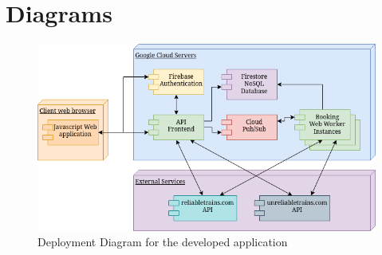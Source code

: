 \documentclass{ds-report}
\begin{document}
	\clearpage

\section{Diagrams}

\begin{figure}[h]
    \centering
    \includegraphics[width = \textwidth]{DeploymentDiagram.png}
    \caption{Deployment Diagram for the developed application}
    \label{fig:deploymentDiagram}
\end{figure}

\begin{thebibliography}{9}

\end{thebibliography}
 
	
\end{document}

